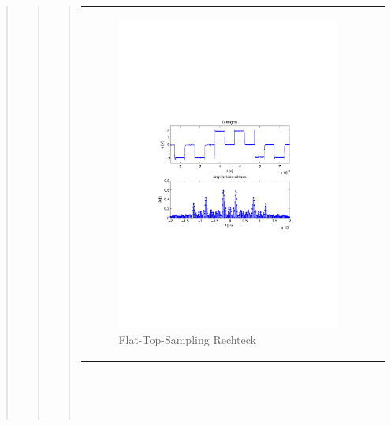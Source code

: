 \begin{quote}
\begin{quote}
\begin{quote}
\begin{center}
\begin{tabular}{ll}
                \begin{minipage}{0.6\textwidth}
                    \begin{figure}[H]
                        \includegraphics[scale=0.55, trim = 16mm 70mm 16mm 85mm, clip]{Bilder/flatskizze}
                       \caption{Flat-Top-Sampling Rechteck}
		              \label{fig:flatrec}
                    \end{figure}
                \end{minipage}
            
            \end{tabular}
            \end{center}
            \ \\
            \ \\
            \ \\
            

\end{quote}
\end{quote}
\end{quote}
